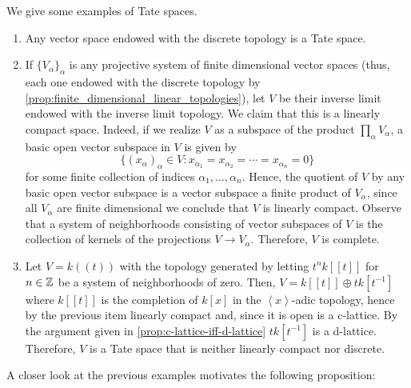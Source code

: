 \begin{example}\label{ex:tate-spaces}
We give some examples of Tate spaces.
\begin{enumerate}[label = (\alph*)]
	\item Any vector space endowed with the discrete topology is a Tate space.
	\item If $\{V_{\alpha}\}_{\alpha}$ is any projective system of finite dimensional vector spaces (thus, each one endowed with the discrete topology by \cref{prop:finite_dimensional_linear_topologies}), let $V$ be their inverse limit endowed with the inverse limit topology. We claim that this is a linearly compact space. Indeed, if we realize $V$ as a subspace of the product $\prod_{\alpha} V_{\alpha}$, a basic open vector subspace in $V$ is given by
	\[
	\{(x_{\alpha})_{\alpha} \in V \colon x_{\alpha_{1}} = x_{\alpha_{2}} = \cdots = x_{\alpha_{n}} = 0\}
	\] for some finite collection of indices $\alpha_{1}, \ldots, \alpha_{n}$. Hence, the quotient of $V$ by any basic open vector subspace is a vector subspace a finite product of $V_{\alpha}$, since all $V_{\alpha}$ are finite dimensional we conclude that $V$ is linearly compact. Observe that a system of neighborhoods consisting of vector subspaces of $V$ is the collection of kernels of the projections $V \to V_{\alpha}$. Therefore, $V$ is complete.

	\item Let $V = k\left((t)\right)$ with the topology generated by letting $t^{n}k\left[[t]\right]$ for $n \in {\mathbb Z}$ be a system of neighborhoods of zero. Then, $V = k\left[[t]\right] \oplus t k[t^{-1}]$ where $k\left[[t]\right]$ is the completion of $k[x]$ in the $\left\langle x\right\rangle$-adic topology, hence by the previous item linearly compact and, since it is open is a c-lattice. By the argument given in \cref{prop:c-lattice-iff-d-lattice} $t k[t^{-1}]$ is a d-lattice. Therefore, $V$ is a Tate space that is neither linearly compact nor discrete.
	
	\end{enumerate}

\end{example}
A closer look at the previous examples motivates the following proposition:
